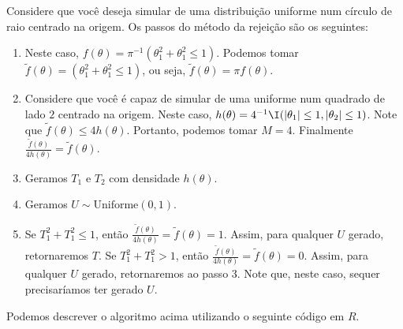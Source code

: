 \begin{example}
 \label{ex:rejection-circle}
 Considere que você deseja simular de uma 
 distribuição uniforme num círculo de
 raio centrado na origem.
 Os passos do método da rejeição são os seguintes:
 \begin{enumerate}
  \item Neste caso, $f(\theta) = \pi^{-1} (\theta_{1}^{2}+\theta_{1}^{2} \leq 1)$.
  Podemos tomar $\tilde{f}(\theta) =(\theta_{1}^{2}+\theta_{1}^{2} \leq 1)$, ou seja,
  $\tilde{f}(\theta) = \pi f(\theta)$.
  \item Considere que você é capaz de simular de uma
  uniforme num quadrado de lado $2$ centrado na origem.
  Neste caso, $h(\theta) = 4^{-1}\I(|\theta_{1}| \leq 1, |\theta_{2}| \leq 1)$.
  Note que $\tilde{f}(\theta) \leq 4h(\theta)$.
  Portanto, podemos tomar $M=4$.
  Finalmente $\frac{\tilde{f}(\theta)}{4h(\theta)} = \tilde{f}(\theta)$.
  \item Geramos $T_{1}$ e $T_{2}$ com densidade $h(\theta)$.
  \item Geramos $U \sim \text{Uniforme}(0,1)$.
  \item Se $T_{1}^{2} + T_{1}^{2} \leq 1$, então
  $\frac{\tilde{f}(\theta)}{4h(\theta)} = \tilde{f}(\theta) = 1$.
  Assim, para qualquer $U$ gerado, retornaremos $T$.
  Se $T_{1}^{2} + T_{1}^{2} > 1$, então
  $\frac{\tilde{f}(\theta)}{4h(\theta)} = \tilde{f}(\theta) = 0$.
  Assim, para qualquer $U$ gerado,
  retornaremos ao passo 3.
  Note que, neste caso, sequer precisaríamos ter
  gerado $U$.
 \end{enumerate}
 Podemos descrever o algoritmo acima utilizando o
 seguinte código em $R$.

\begin{knitrout}
\color{fgcolor}\begin{kframe}
\begin{alltt}
\hlcom{#######################################################}
\hlcom{#######################################################}
 \hlkwb{=} 
 \hlkwb{=} \hlstd{()} \hlstd{(}\hlstd{,}\hlopt{-}\hlstd{,}\hlstd{)}
 \hlkwb{=} \hlstd{(}\hlstd{) ((x[}\hlstd{]}\hlopt{^} \hlopt{<=} \hlstd{)} \hlopt{&} \hlstd{(x[}\hlstd{]}\hlopt{^} \hlopt{<=} \hlstd{))}\hlopt{/}
 \hlkwb{=} \hlstd{(}\hlstd{) (x[}\hlstd{]}\hlopt{^} \hlopt{+} \hlstd{x[}\hlstd{]}\hlopt{^} \hlopt{<=} \hlstd{)}\hlopt{/}
 \hlkwb{=} \hlopt{/}
 \hlkwb{=} 
\end{alltt}
\end{kframe}
\end{knitrout}


\end{example}
